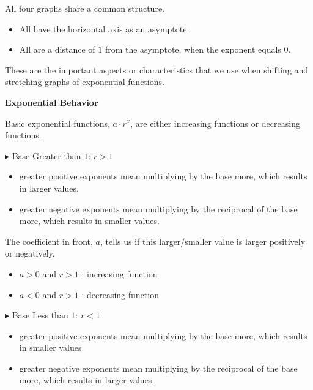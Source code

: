 \documentclass{ximera}
\begin{document}
All four graphs share a common structure.


\begin{itemize}
\item All have the horizontal axis as an asymptote.
\item All are a distance of $1$ from the asymptote, when the exponent equals $0$.
\end{itemize}

These are the important aspects or characteristics that we use when shifting and stretching graphs of exponential functions.












\begin{observation} \textbf{\textcolor{blue!75!black}{Exponential Behavior}}


Basic exponential functions, $a \cdot r^x$, are either increasing functions or decreasing functions.


$\blacktriangleright$  Base Greater than $1$: $r > 1$


\begin{itemize}
\item greater positive exponents mean multiplying by the base more, which results in larger values.  
\item greater negative exponents mean multiplying by the reciprocal of the base more, which results in smaller values.  
\end{itemize}


The coefficient in front, $a$, tells us if this larger/smaller value is larger positively or negatively.


\begin{itemize}
\item $a > 0$ and $r > 1$ : increasing function
\item $a < 0$ and $r > 1$ : decreasing function  
\end{itemize}






$\blacktriangleright$  Base Less than $1$: $r < 1$


\begin{itemize} 
\item greater positive exponents mean multiplying by the base more, which results in smaller values.  
\item greater negative exponents mean multiplying by the reciprocal of the base more, which results in larger values.  
\end{itemize}



\end{observation}
\end{document}
